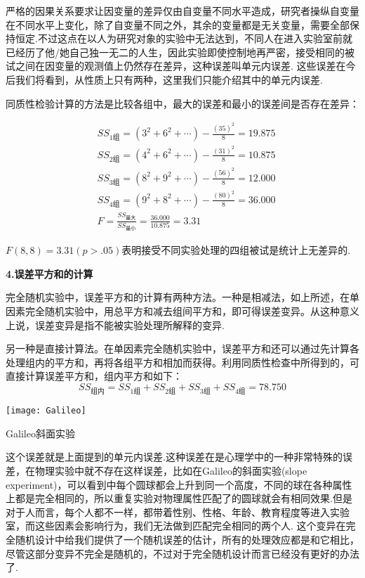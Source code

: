 严格的因果关系要求让因变量的差异仅由自变量不同水平造成，研究者操纵自变量在不同水平上变化，除了自变量不同之外，其余的变量都是无关变量，需要全部保持恒定.不过这点在以人为研究对象的实验中无法达到，不同人在进入实验室前就已经历了他/她自己独一无二的人生，因此实验即使控制地再严密，接受相同的被试之间在因变量的观测值上仍然存在差异，这种误差叫单元内误差.
这些误差在今后我们将看到，从性质上只有两种，这里我们只能介绍其中的单元内误差.

同质性检验计算的方法是比较各组中，最大的误差和最小的误差间是否存在差异：

\begin{align*}
    & SS_{1\text{组}} = (3^2+6^2+\cdots)-\frac{(35)^2}{8}=19.875\\
    & SS_{2\text{组}} = (4^2+6^2+\cdots)-\frac{(31)^2}{8}=10.875\\    
    & SS_{3\text{组}} = (8^2+9^2+\cdots)-\frac{(56)^2}{8}=12.000\\
    & SS_{4\text{组}} = (9^2+8^2+\cdots)-\frac{(80)^2}{8}=36.000\\
    & F=\frac{SS_{\text{最大}}}{SS_{\text{最小}}}=\frac{36.000}{10.875}=3.31
\end{align*}

$F(8,8)=3.31(p>.05)$表明接受不同实验处理的四组被试是统计上无差异的.


\textbf{4.误差平方和的计算}

完全随机实验中，误差平方和的计算有两种方法。一种是相减法，如上所述，在单因素完全随机实验中，用总平方和减去组间平方和，即可得误差变异。从这种意义上说，误差变异是指不能被实验处理所解释的变异.

另一种是直接计算法。在单因素完全随机实验中，误差平方和还可以通过先计算各处理组内的平方和，再将各组平方和相加而获得。利用同质性检查中所得到的，可直接计算误差平方和，组内平方和如下：
\[ SS_{\text{组内}}=SS_{1\text{组}}+SS_{2\text{组}}+SS_{3\text{组}}+SS_{4\text{组}}=78.750 \]

\begin{marginfigure}
    \texttt{[image: Galileo]}
    \caption{Galileo斜面实验}
\end{marginfigure}

这个误差就是上面提到的单元内误差.这种误差在是心理学中的一种非常特殊的误差，在物理实验中就不存在这样误差，比如在Galileo的斜面实验(slope experiment)，可以看到中每个圆球都会上升到同一个高度，不同的球在各种属性上都是完全相同的，所以重复实验对物理属性匹配了的圆球就会有相同效果.但是对于人而言，每个人都不一样，都带着性别、性格、年龄、教育程度等进入实验室，而这些因素会影响行为，我们无法做到匹配完全相同的两个人.
这个变异在完全随机设计中给我们提供了一个随机误差的估计，所有的处理效应都是和它相比，尽管这部分变异不完全是随机的，不过对于完全随机设计而言已经没有更好的办法了.

